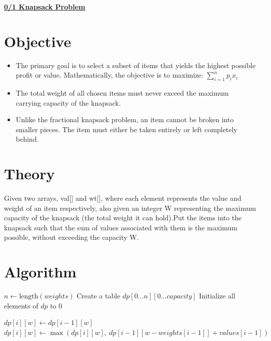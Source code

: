 \documentclass{article}
\begin{document}
\vspace{0.1mm}
\begin{center}
    \LARGE\textbf{\underline{0/1 Knapsack Problem}}\end{center}
{\normalsize
\section*{Objective}
\begin{itemize}
    \item The primary goal is to select a subset of items that yields the highest possible profit or value. Mathematically, the objective is to maximize: \(\sum_{i=1}^{n} p_i x_i\)
    \item The total weight of all chosen items must never exceed the maximum carrying capacity of the knapsack.
    \item Unlike the fractional knapsack problem, an item cannot be broken into smaller pieces. The item must either be taken entirely or left completely behind.
\end{itemize}

\section*{Theory}
\paragraph{} 
Given two arrays, val[] and wt[], where each element represents the value and weight of an item respectively, also given an integer W representing the maximum capacity of the knapsack (the total weight it can hold).Put the items into the knapsack such that the sum of values associated with them is the maximum possible, without exceeding the capacity W.
\section*{Algorithm}
\begin{algorithm}
\caption{Binary Knapsack (0/1 Knapsack)}
\begin{algorithmic}[1]
    \State $n \gets \text{length}(weights)$
    \State Create a table $dp[0 \dots n][0 \dots capacity]$
    \State Initialize all elements of $dp$ to $0$

            \State $dp[i][w] \gets dp[i-1][w]$
                \State $dp[i][w] \gets \max(dp[i][w],\ dp[i-1][w-weights[i-1]] + values[i-1])$
            \EndIf
        \EndFor
    \EndFor


\end{algorithmic}
\end{algorithm}}
\end{document}
